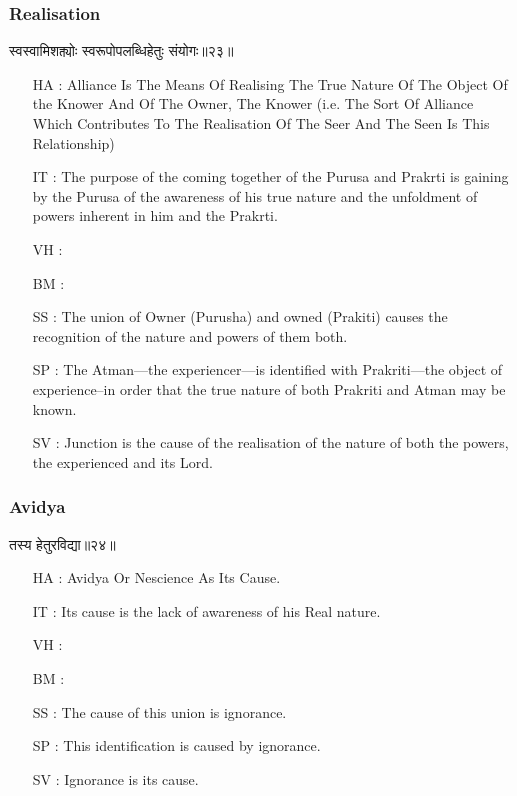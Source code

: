 \begin{frame}[fragile]\frametitle{Realisation}
\begin{sanskrit}
स्वस्वामिशक्त्योः स्वरूपोपलब्धिहेतुः संयोगः॥२३॥
\end{sanskrit}

	\begin{itemize}
	\item [HA]: Alliance Is The Means Of Realising The True Nature Of The Object Of the Knower And Of The Owner, The Knower (i.e. The Sort Of Alliance Which Contributes To The Realisation Of The Seer And The Seen Is This Relationship)
	\item [IT]: The purpose of the coming together of the Purusa and Prakrti is gaining by the Purusa of the awareness of his true nature and the unfoldment of powers inherent in him and the Prakrti.
	\item [VH]: 
	\item [BM]: 
	\item [SS]: The union of Owner (Purusha) and owned (Prakiti) causes the recognition of the nature and powers of them both.
	\item [SP]: The Atman—the experiencer—is identified with Prakriti—the object of experience–in order that the true nature of both Prakriti and Atman may be known.
	\item [SV]: Junction is the cause of the realisation of the nature of both the powers, the experienced and its Lord. 
	\end{itemize}
\end{frame}

\begin{frame}[fragile]\frametitle{Avidya}
\begin{sanskrit}
तस्य हेतुरविद्या॥२४॥
\end{sanskrit}

	\begin{itemize}
	\item [HA]: Avidya Or Nescience As Its Cause.
	\item [IT]: Its cause is the lack of awareness of his Real nature.
	\item [VH]: 
	\item [BM]: 
	\item [SS]: The cause of this union is ignorance.
	\item [SP]: This identification is caused by ignorance.
	\item [SV]: Ignorance is its cause. 
	\end{itemize}
\end{frame}

